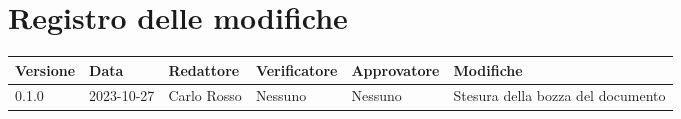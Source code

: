 \section*{Registro delle modifiche}

\begin{table}[H]
    \renewcommand{\arraystretch}{1.5}
	\centering
	\fontsize{10}{12}\selectfont
	\begin{tabularx}{\textwidth}{l|l|l|l|l|X}
		\textbf{Versione} & \textbf{Data} & \textbf{Redattore} &
		\textbf{Verificatore} & \textbf{Approvatore} & \textbf{Modifiche} \\
		\toprule
		0.1.0 & 2023-10-27 & Carlo Rosso & Nessuno & Nessuno & Stesura
		della bozza del documento \\
		\midrule
	\end{tabularx}
\end{table}
